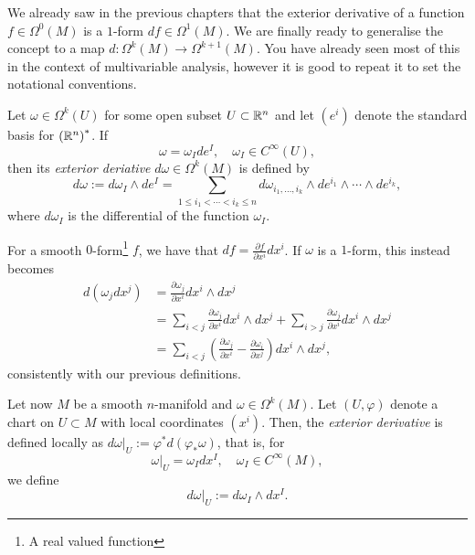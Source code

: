 We already saw in the previous chapters that the exterior derivative of a function $f\in\Omega^0(M)$ is a $1$-form $df\in\Omega^1(M)$.
We are finally ready to generalise the concept to a map $d:\Omega^k(M)\to\Omega^{k+1}(M)$.
You have already seen most of this in the context of multivariable analysis, however it is good to repeat it to set the notational conventions.

\begin{definition}
  Let $\omega\in\Omega^k(U)$ for some open subset $U\subset\mathbb{R}^n$ and let $(e^i)$ denote the standard basis for ${(\mathbb{R}^n)}^*$. If
  \begin{equation}
    \omega = \omega_I de^I, \quad \omega_I\in C^\infty(U),
  \end{equation}
  then its \emph{exterior deriative} $d\omega \in\Omega^k(M)$ is defined by
  \begin{equation}
    d\omega := d\omega_I \wedge de^I = \sum_{1\leq i_1 < \cdots < i_k \leq n} d\omega_{i_1,\ldots,i_k}\wedge de^{i_1}\wedge\cdots\wedge de^{i_k},
  \end{equation}
  where $d\omega_I$ is the differential of the function $\omega_I$.
\end{definition}

\begin{example}
For a smooth $0$-form\footnote{A real valued function} $f$, we have that $df = \frac{\partial f}{\partial x^i}dx^i$.
If $\omega$ is a $1$-form, this instead becomes
\begin{align}
  d(\omega_j dx^j)
  &= \frac{\partial \omega_j}{\partial x^i} dx^i \wedge dx^j \\
  &= \sum_{i<j} \frac{\partial \omega_j}{\partial x^i} dx^i \wedge dx^j  + \sum_{i>j} \frac{\partial \omega_j}{\partial x^i} dx^i \wedge dx^j \\
  &= \sum_{i<j} \left(\frac{\partial \omega_j}{\partial x^i} - \frac{\partial \omega_i}{\partial x^j} \right) dx^i\wedge dx^j,
\end{align}
consistently with our previous definitions.
\end{example}

\begin{definition}
  Let now $M$ be a smooth $n$-manifold and $\omega\in\Omega^k(M)$.
  Let $(U,\varphi)$ denote a chart on $U\subset M$ with local coordinates $(x^i)$.
  Then, the \emph{exterior derivative} is defined locally as $d\omega|_U := \varphi^*d(\varphi_* \omega)$, that is, for
  \begin{equation}
    \omega|_U = \omega_I dx^I, \quad \omega_I \in C^\infty(M),
  \end{equation}
  we define
  \begin{equation}\label{eq:localdw}
    d\omega|_U := d\omega_I \wedge dx^I.
  \end{equation}
\end{definition}

